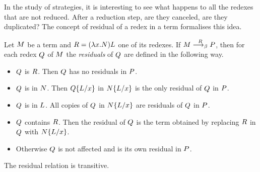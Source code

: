 \begin{THESIS}
	In the study of strategies, it is interesting to see what happens to all the redexes that are not reduced. After a reduction step, are they canceled, are they duplicated? The concept of residual of a redex in a term formalises this idea.
	\begin{definition}
		Let $M$ be a term and $R=(\lambda x.N)L$ one of its redexes. If $M\overset{R}{\longrightarrow_\beta}P$, then for each redex $Q$ of $M$ the \emph{residuals} of $Q$ are defined in the following way.
		\begin{itemize}
			\item $Q$ is $R$. Then $Q$ has no residuals in $P$.
			\item $Q$ is in $N$. Then $Q\{L/x\}$ in $N\{L/x\}$ is the only residual of $Q$ in $P$.
			\item $Q$ is in $L$. All copies of $Q$ in $N\{L/x\}$ are residuals of $Q$ in $P$.
			\item $Q$ contains $R$. Then the residual of $Q$ is the term obtained by replacing $R$ in $Q$ with $N\{L/x\}$.
			\item Otherwise $Q$ is not affected and is its own residual in $P$.
		\end{itemize}
		The residual relation is transitive.
	\end{definition}

\end{THESIS}
